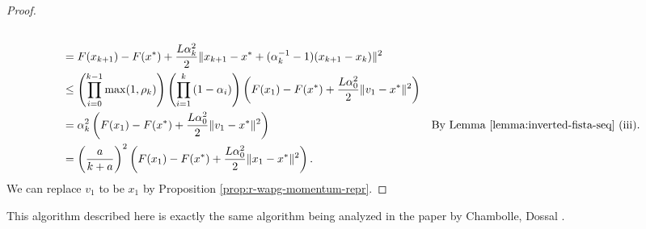\documentclass[12pt]{article}
\begin{document}
\begin{proof}
\begin{align*}
            \\
            & = F(x_{k + 1}) - F(x^*) + \frac{L\alpha_k^2}{2}\Vert x_{k + 1} - x^* + (\alpha_k^{-1} - 1)(x_{k + 1} - x_k)\Vert^2
            \\
            & \le 
            \left(
                \prod_{i = 0}^{k - 1} \max(1, \rho_{k})
            \right)
            \left(
                \prod_{i = 1}^{k} \left(1  - \alpha_i\right)
            \right)
            \left(
                F(x_1) - F(x^*) + \frac{L\alpha_0^2}{2}\Vert v_1 - x^*\Vert^2
            \right)
            \\
            &= 
            \alpha_k^2
            \left(
                F(x_1) - F(x^*) + \frac{L\alpha_0^2}{2}\Vert v_1 - x^*\Vert^2
            \right) 
            & \text{By Lemma \ref{lemma:inverted-fista-seq} (iii). }
            \\
            &= 
            \left(\frac{a}{k + a}\right)^2
            \left(
                F(x_1) - F(x^*) + \frac{L\alpha_0^2}{2}\Vert x_1 - x^*\Vert^2
            \right). 
        \end{align*}
        We can replace $v_1$ to be $x_1$ by Proposition \ref{prop:r-wapg-momentum-repr}. 
    \end{proof}
    \begin{remark}
        This algorithm described here is exactly the same algorithm being analyzed in the paper by Chambolle, Dossal \cite{chambolle_convergence_2015}. 

    \end{remark}
\end{document}
